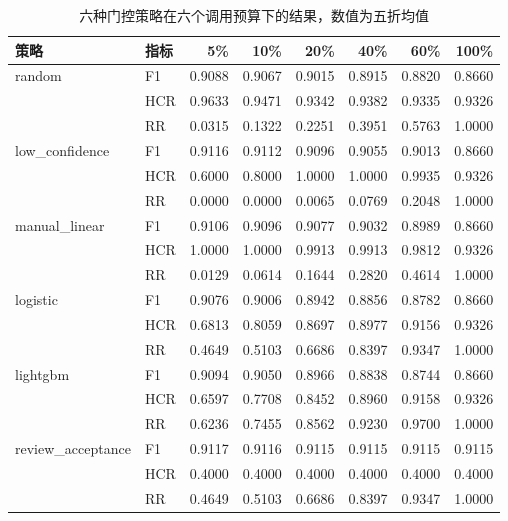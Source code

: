 \begin{table}[t]
  \centering
  \caption{六种门控策略在六个调用预算下的结果，数值为五折均值}
  \label{tab:rq3_budget}
  \setlength{\tabcolsep}{3.5pt}
  \begin{tabular}{llrrrrrr}
    \hline
    策略 & 指标 & 5\% & 10\% & 20\% & 40\% & 60\% & 100\% \\
    \hline
    random & F1 & 0.9088 & 0.9067 & 0.9015 & 0.8915 & 0.8820 & 0.8660 \\
           & HCR & 0.9633 & 0.9471 & 0.9342 & 0.9382 & 0.9335 & 0.9326 \\
           & RR & 0.0315 & 0.1322 & 0.2251 & 0.3951 & 0.5763 & 1.0000 \\
    \hline
    low\_confidence & F1 & 0.9116 & 0.9112 & 0.9096 & 0.9055 & 0.9013 & 0.8660 \\
           & HCR & 0.6000 & 0.8000 & 1.0000 & 1.0000 & 0.9935 & 0.9326 \\
           & RR & 0.0000 & 0.0000 & 0.0065 & 0.0769 & 0.2048 & 1.0000 \\
    \hline
    manual\_linear & F1 & 0.9106 & 0.9096 & 0.9077 & 0.9032 & 0.8989 & 0.8660 \\
           & HCR & 1.0000 & 1.0000 & 0.9913 & 0.9913 & 0.9812 & 0.9326 \\
           & RR & 0.0129 & 0.0614 & 0.1644 & 0.2820 & 0.4614 & 1.0000 \\
    \hline
    logistic & F1 & 0.9076 & 0.9006 & 0.8942 & 0.8856 & 0.8782 & 0.8660 \\
           & HCR & 0.6813 & 0.8059 & 0.8697 & 0.8977 & 0.9156 & 0.9326 \\
           & RR & 0.4649 & 0.5103 & 0.6686 & 0.8397 & 0.9347 & 1.0000 \\
    \hline
    lightgbm & F1 & 0.9094 & 0.9050 & 0.8966 & 0.8838 & 0.8744 & 0.8660 \\
           & HCR & 0.6597 & 0.7708 & 0.8452 & 0.8960 & 0.9158 & 0.9326 \\
           & RR & 0.6236 & 0.7455 & 0.8562 & 0.9230 & 0.9700 & 1.0000 \\
    \hline
    review\_acceptance & F1 & 0.9117 & 0.9116 & 0.9115 & 0.9115 & 0.9115 & 0.9115 \\
           & HCR & 0.4000 & 0.4000 & 0.4000 & 0.4000 & 0.4000 & 0.4000 \\
           & RR & 0.4649 & 0.5103 & 0.6686 & 0.8397 & 0.9347 & 1.0000 \\
    \hline
  \end{tabular}
\end{table}

